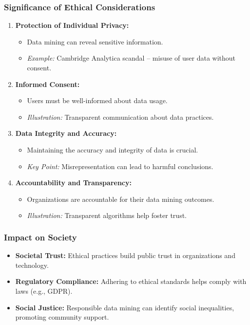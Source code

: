 \documentclass[aspectratio=169]{beamer}
\begin{document}
\begin{frame}[fragile]
    \frametitle{Significance of Ethical Considerations}
    \begin{enumerate}
        \item \textbf{Protection of Individual Privacy:}
            \begin{itemize}
                \item Data mining can reveal sensitive information.
                \item \textit{Example:} Cambridge Analytica scandal – misuse of user data without consent.
            \end{itemize}
        
        \item \textbf{Informed Consent:}
            \begin{itemize}
                \item Users must be well-informed about data usage.
                \item \textit{Illustration:} Transparent communication about data practices.
            \end{itemize}

        \item \textbf{Data Integrity and Accuracy:}
            \begin{itemize}
                \item Maintaining the accuracy and integrity of data is crucial.
                \item \textit{Key Point:} Misrepresentation can lead to harmful conclusions.
            \end{itemize}
        
        \item \textbf{Accountability and Transparency:}
            \begin{itemize}
                \item Organizations are accountable for their data mining outcomes.
                \item \textit{Illustration:} Transparent algorithms help foster trust.
            \end{itemize}
    \end{enumerate}
\end{frame}

\begin{frame}[fragile]
    \frametitle{Impact on Society}
    \begin{itemize}
        \item \textbf{Societal Trust:} Ethical practices build public trust in organizations and technology.
        \item \textbf{Regulatory Compliance:} Adhering to ethical standards helps comply with laws (e.g., GDPR).
        \item \textbf{Social Justice:} Responsible data mining can identify social inequalities, promoting community support.
    \end{itemize}
\end{frame}
\end{document}
